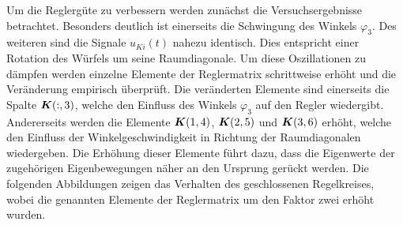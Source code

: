 Um die Reglergüte zu verbessern werden zunächst die Versuchsergebnisse betrachtet. Besonders deutlich ist einerseits die Schwingung des Winkels $\varphi_3$. Des weiteren sind die Signale $u_{Ki}(t)$ nahezu identisch. Dies entspricht einer Rotation des Würfels um seine Raumdiagonale. Um diese Oszillationen zu dämpfen werden einzelne Elemente der Reglermatrix schrittweise erhöht und die Veränderung empirisch überprüft. Die veränderten Elemente sind einerseits die Spalte $\boldsymbol{K}(:,3)$, welche den Einfluss des Winkels $\varphi_3$ auf den Regler wiedergibt. Andererseits werden die Elemente $\boldsymbol{K}(1,4)$, $\boldsymbol{K}(2,5)$ und $\boldsymbol{K}(3,6)$ erhöht, welche den Einfluss der Winkelgeschwindigkeit in Richtung der Raumdiagonalen wiedergeben. Die Erhöhung dieser Elemente führt dazu, dass die Eigenwerte der zugehörigen Eigenbewegungen näher an den Ursprung gerückt werden. Die folgenden Abbildungen zeigen das Verhalten des geschlossenen Regelkreises, wobei die genannten Elemente der Reglermatrix um den Faktor zwei erhöht wurden.
